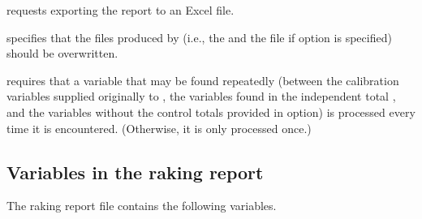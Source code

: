 \hangpara
{} requests exporting the report to an Excel file.

\hangpara
{} specifies that the files produced by  (i.e., the 
    and the {} file if  option is specified) should be overwritten.

\hangpara
{} requires that a variable that may be found repeatedly (between the calibration variables
    supplied originally to , the variables found in the independent total ,
    and the variables without the control totals provided in  option) is processed every
    time it is encountered. (Otherwise, it is only processed once.)

\subsection{Variables in the raking report}

The raking report file contains the following variables.

